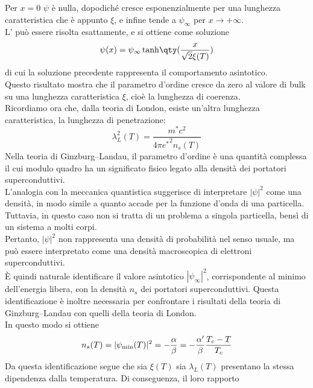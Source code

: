 \hspace{-0.6cm}Per $x=0$ $\psi$ è nulla, dopodiché cresce esponenzialmente per una lunghezza caratteristica che è appunto $\xi$, e infine tende a $\psi_{\infty}$ per $x \to +\infty$.\\
L' può essere risolta esattamente, e si ottiene come soluzione
\begin{equation*}
   \psi(x) = \psi_{\infty} \tanh\!\qty(\frac{x}{\sqrt{2}\xi(T)})
\end{equation*}
di cui la soluzione precedente rappresenta il comportamento asintotico.\\
Questo risultato mostra che il parametro d'ordine cresce da zero al valore di bulk su una lunghezza caratteristica $\xi$, cioè la lunghezza di coerenza.\\
Ricordiamo ora che, dalla teoria di London, esiste un'altra lunghezza caratteristica, la lunghezza di penetrazione:
\begin{equation*}
   \lambda_L^2(T)
   = \frac{m^* c^2}{4\pi {e^*}^2 n_s(T)}
\end{equation*}
Nella teoria di Ginzburg--Landau, il parametro d'ordine è una quantità complessa il cui modulo quadro ha un significato fisico legato alla densità dei portatori superconduttivi.\\
L'analogia con la meccanica quantistica suggerisce di interpretare $|\psi|^2$ come una densità, in modo simile a quanto accade per la funzione d'onda di una particella. Tuttavia, in questo caso non si tratta di un problema a singola particella, bensì di un sistema a molti corpi. \\
Pertanto, $|\psi|^2$ non rappresenta una densità di probabilità nel senso usuale, ma può essere interpretato come una densità macroscopica di elettroni superconduttivi.\\
È quindi naturale identificare il valore asintotico $|\psi_{\infty}|^2$, corrispondente al minimo dell'energia libera, con la densità $n_s$ dei portatori superconduttivi. Questa identificazione è inoltre necessaria per confrontare i risultati della teoria di Ginzburg--Landau con quelli della teoria di London.\\
In questo modo si ottiene
\begin{equation*}
   n_s(T)
   =|\psi_{\rm min}(T)|^2
   =-\frac{\alpha}{\beta}
   =-\frac{\alpha'}{\beta} \frac{T_c - T}{T_c}
\end{equation*}
Da questa identificazione segue che sia $\xi(T)$ sia $\lambda_L(T)$ presentano la stessa dipendenza dalla temperatura. Di conseguenza, il loro rapporto

